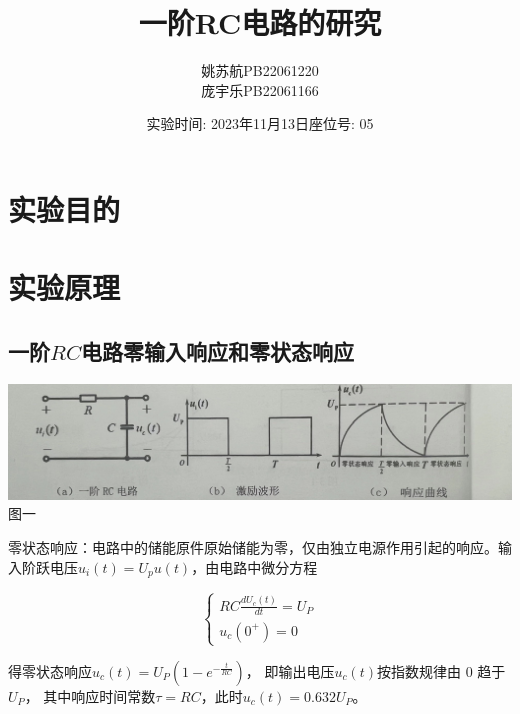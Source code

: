 \documentclass[a4paper]{article}
\title{\textbf{一阶RC电路的研究}}
\author{姚苏航\qquad PB22061220 \\ 庞宇乐\qquad PB22061166}
\date{实验时间: 2023年11月13日\qquad 座位号: 05}
\begin{document}
    \maketitle


    \section{实验目的}\label{sec:}



    \vspace{1cm}


    \section{实验原理}\label{sec:2}

    \subsection{一阶$RC$电路零输入响应和零状态响应}\label{subsec:$rc$}
    \begin{center}
        \includegraphics[scale=0.08]{1}\\
        {\small 图一}
    \end{center}

    {{零状态响应：电路中的储能原件原始储能为零，仅由独立电源作用引起的响应。输入阶跃电压$u_{i}(t) = U_{p}u(t)$，由电路中微分方程}}

    \begin{equation}
        \left\{
        \begin{array}{c}
            RC\frac{d U_{c}(t)}{d t}=U_{P} \\
            u_{c}(0^{+})=0
        \end{array}
        \right.\label{eq:equation}
    \end{equation}

    {{得零状态响应$u_{c}(t) = U_{P}\left(1 − e^{-\frac{t}{RC}}\right)$， 即输出电压$u_{c}(t)$按指数规律由 0 趋于$U_{P}$， 其中响应时间常数$\tau =RC$，此时$u_{c}(t)=0.632U_{P}$。}}
\end{document}
